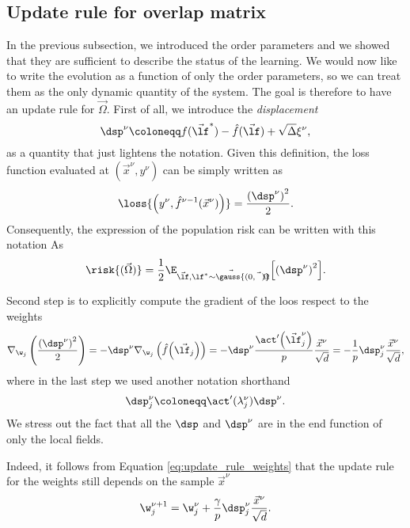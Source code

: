 \subsection{Update rule for overlap matrix} \label{subsec:updateruleforoverlap}
In the previous subsection, we introduced the order parameters and we showed that 
they are sufficient to describe the status of the learning. We would now like
to write the evolution as a function of only the order parameters,
so we can treat them as the only dynamic quantity of the system.
The goal is therefore to have an update rule for \(\vec{\Omega}\).
First of all, we introduce the \emph{displacement}
\[
  \dsp^\nu \coloneqq f{(\vec{\lf}^*)} - \hat{f}{(\vec{\lf})} + \sqrt{\Delta} \xi^\nu,
\]
as a quantity that just lightens the notation.
Given this definition, the loss function evaluated at \((\vec{x}^\nu,y^\nu)\)
can be simply written as
\[\loss{\left(y^\nu,\hat{f}^{\nu-1}{\left(\vec{x}^\nu\right)}\right)} = \frac{\left(\dsp^\nu\right)^2}{2}.\]
Consequently, the expression of the population risk can be written with this notation As
\begin{equation}\label{eq:risk_lambda_expval}
  \risk{(\vec{\Omega})} = \frac12\E_{\vec{\lf},\vec{\lf^* \sim \gauss{(0,\vec{\Omega})}}}
                              {\left[\left(\dsp^\nu\right)^2\right]}.
\end{equation}

Second step is to explicitly compute the gradient of the loos respect to the weights
\[
  \nabla_{\w_j}\left(\frac{\left(\dsp^\nu\right)^2}{2}\right) =
    -\dsp^\nu \nabla_{\w_j}\left(\hat{f}{\left(\vec{\lf_j}\right)}\right) =
    -\dsp^\nu \frac{\act'{\left(\vec{\lf}^\nu_j\right)}}{p}\frac{\vec{x}^\nu}{\sqrt{d}} =
    -\frac{1}{p}\dsp^\nu_j \frac{\vec{x}^\nu}{\sqrt{d}},
\]
where in the last step we used another notation shorthand
\[
  \dsp^\nu_j \coloneqq \act'{(\lambda_j^\nu)} \dsp^\nu.
\]
We stress out the fact that all the \(\dsp\) and \(\dsp^\nu\) are in the end function of only
the local fields.

Indeed, it follows from Equation \eqref{eq:update_rule_weights} that the update rule
for the weights still depends on the sample \(\vec{x}^\nu\)
\[
  \w^{\nu+1}_j = \w^{\nu}_j + \frac{\gamma}{p} \dsp^\nu_j \frac{\vec{x}^\nu}{\sqrt{d}}.
\]

